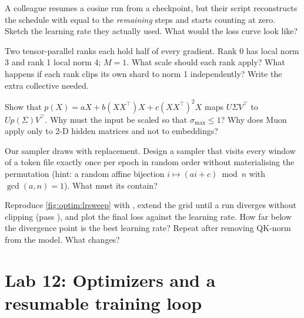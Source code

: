\begin{exercise}
A colleague resumes a cosine run from a checkpoint, but their script reconstructs the schedule
with  equal to the \emph{remaining} steps and starts counting at zero. Sketch the
learning rate they actually used. What would the loss curve look like?
\end{exercise}

\begin{exercise}
Two tensor-parallel ranks each hold half of every gradient. Rank 0 has local norm 3 and rank 1
local norm 4; $M=1$. What scale should each rank apply? What happens if each rank clips its
own shard to norm 1 independently? Write the extra collective needed.
\end{exercise}

\begin{exercise}
Show that $p(X)=aX+b(XX^\top)X+c(XX^\top)^2X$ maps $U\Sigma V^\top$ to $Up(\Sigma)V^\top$. Why must
the input be scaled so that $\sigma_{\max}\le1$? Why does Muon apply only to 2-D hidden matrices
and not to embeddings?
\end{exercise}

\begin{exercise}
Our sampler draws with replacement. Design a sampler that visits every window of a token file
exactly once per epoch in random order without materialising the permutation (hint: a random
affine bijection $i\mapsto (ai+c)\bmod n$ with $\gcd(a,n)=1$). What must its 
contain?
\end{exercise}

\begin{exercise}
Reproduce \cref{fig:optim:lrsweep} with , extend the grid until a run
diverges without clipping (pass ), and plot the final loss against the
learning rate. How far below the divergence point is the best learning rate? Repeat after
removing QK-norm from the model. What changes?
\end{exercise}

\section{Lab 12: Optimizers and a resumable training loop}\label{sec:optim:lab}

